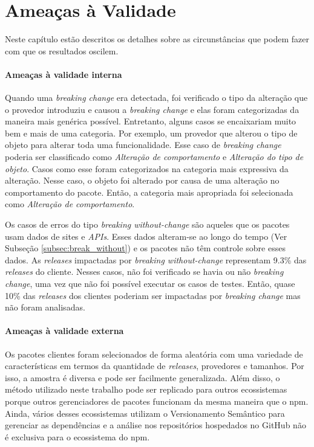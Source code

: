 \chapter{Ameaças à Validade}
\label{cap:threats}

Neste capítulo estão descritos os detalhes sobre as circunstâncias que podem fazer com que os resultados oscilem.

\subsubsection{Ameaças à validade interna}
Quando uma \textit{breaking change} era detectada, foi verificado o tipo da alteração que o provedor introduziu e causou a \textit{breaking change} e elas foram categorizadas da maneira mais genérica possível. Entretanto, alguns casos se encaixariam muito bem e mais de uma categoria. Por exemplo, um provedor que alterou o tipo de objeto para alterar toda uma funcionalidade. Esse caso de \textit{breaking change} poderia ser classificado como \textit{Alteração de comportamento} e \textit{Alteração do tipo de objeto}. Casos como esse foram categorizados na categoria mais expressiva da alteração. Nesse caso, o objeto foi alterado por causa de uma alteração no comportamento do pacote. Então, a categoria mais apropriada foi selecionada como \textit{Alteração de comportamento}.

Os casos de erros do tipo \textit{breaking without-change} são aqueles que os pacotes usam dados de sites e \textit{APIs}. Esses dados alteram-se ao longo do tempo (Ver Subseção \ref{subsec:break_without}) e os pacotes não têm controle sobre esses dados. As \textit{releases} impactadas por \textit{breaking without-change} representam 9.3\% das \textit{releases} do cliente. Nesses casos, não foi verificado se havia ou não \textit{breaking change}, uma vez que não foi possível executar os casos de testes. Então, quase 10\% das \textit{releases} dos clientes poderiam ser impactadas por \textit{breaking change} mas não foram analisadas.

\subsubsection{Ameaças à validade externa}
Os pacotes clientes foram selecionados de forma aleatória com uma variedade de características em termos da quantidade de \textit{releases}, provedores e tamanhos. Por isso, a amostra é diversa e pode ser facilmente generalizada. Além disso, o método utilizado neste trabalho pode ser replicado para outros ecossistemas porque outros gerenciadores de pacotes funcionam da mesma maneira que o \textsf{npm}. Ainda, vários desses ecossistemas utilizam o Versionamento Semântico para gerenciar as dependências e a análise nos repositórios hospedados no \textsf{GitHub} não é exclusiva para o ecossistema do \textsf{npm}.

